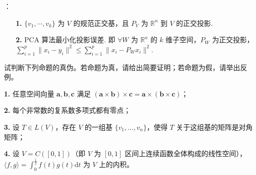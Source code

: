 \documentclass[UTF8,14pt,normal]{ctexart}
\begin{document}
：
\begin{enumerate}
    \item[\textbf{1.}] $\{v_1,\cdots,v_k\}$ 为 $V$ 的规范正交基，且 $P_V$ 为 $\mathbb{R}^n$ 到 $V$ 的正交投影.
    \item[\textbf{2.}] PCA 算法最小化投影误差. 即 $\forall W$ 为 $\mathbb{R}^n$ 的 $k$ 维子空间，$P_W$ 为正交投影，$\displaystyle\sum_{i=1}^p \|x_i-y_i\|^2 \le \displaystyle\sum_{i=1}^p \|x_i-P_W x_i\|^2$.
\end{enumerate}

 试判断下列命题的真伪。若命题为真，请给出简要证明；若命题为假，请举出反例。

\textbf{1.} 任意空间向量 $\mathbf{a}, \mathbf{b}, \mathbf{c}$ 满足 $(\mathbf{a}\times\mathbf{b})\times\mathbf{c} = \mathbf{a}\times(\mathbf{b}\times\mathbf{c})$；

\textbf{2.} 每个非常数的复系数多项式都有零点；

\textbf{3.} 设 $T \in L(V)$，存在 $V$ 的一组基 $\{v_1, \ldots, v_n\}$，使得 $T$ 关于这组基的矩阵是对角矩阵；

\textbf{4.} 设 $V = C([0,1])$（即 $V$ 为 $[0,1]$ 区间上连续函数全体构成的线性空间），$\langle f, g \rangle = \displaystyle\int_0^{\frac{1}{2}} f(t)g(t)\mathrm{d}t$ 为 $V$ 上的内积。
\end{document}
